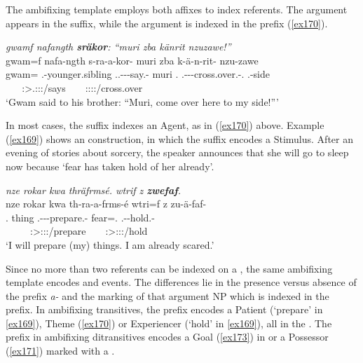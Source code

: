 The ambifixing template employs both affixes to index referents. The  argument appears in the suffix, while the  argument is indexed in the prefix (\ref{ex170}).

\begin{exe}
	\ex \emph{gwamf nafangth \textbf{sräkor}: ``muri zba känrit nzuzawe!''}\\
	\glll gwam=f nafa-ngth s-ra-a-kor-\Zero{} muri zba k-ä-n-rit-\Zero{} nzu-zawe\\
	gwam=\Erg{} \Third.\Poss-younger.sibling \Tsg.\Masc.\Bet-\Irr-\Ndu-say.\Rs-\Stsg{} muri \Prox.\Abl{} \M.\Bet-\Ndu-\Venit-cross.over.\Rs-\Ssg.\Imp{} \Fsg.\Poss-side\\
	~ ~ {\Stsg:\Sbj>\Tsg.\Masc:\Obj:\Irr:\Pfv/says} ~ ~ {\Ssg:\Sbj:\Imp:\Pfv:\Venit/cross.over} ~\\
	\trans `Gwam said to his brother: ``Muri, come over here to my side!'''\\ 
	\label{ex170}
\end{exe}

In most cases, the suffix indexes an Agent, as in (\ref{ex170}) above. Example (\ref{ex169}) shows an  construction, in which the suffix encodes a Stimulus. After an evening of stories about sorcery, the speaker announces that she will go to sleep now because `fear has taken hold of her already'.

\begin{exe}
	\ex \emph{nze rokar kwa thräfrmsé. wtrif z \textbf{zwefaf}.}\\
	\glll nze rokar kwa th-ra-a-frms-é wtri=f z{\fixgll} zu-ä-faf-\Zero\\
	\Fsg.\Erg{} thing \Fut{} \Stnsg.\Bet-\Irr-\Vc\textbar\Ndu-prepare.\Rs-\Fsg{} fear=\Erg.\Sg{} \Iam{} \Fsg.\Gam-\Ndu-hold.\Rs-\Stsg{}\\
	~ ~ ~ {\Fsg:\Sbj>\Stpl:\Obj:\Irr:\Pfv/prepare} ~ ~ {\Stsg:\Sbj>\Fsg:\Obj:\Rpst:\Pfv/hold}\\
	\trans `I will prepare (my) things. I am already scared.' 
	\label{ex169}
\end{exe}

Since no more than two referents can be indexed on a , the same ambifixing template encodes  and  events. The differences lie in the presence versus absence of the  prefix \emph{a-} and the  marking of that argument NP which is indexed in the prefix. In ambifixing transitives, the prefix encodes a Patient (`prepare' in \ref{ex169}), Theme (\ref{ex170}) or Experiencer (`hold' in \ref{ex169}), all in the . The prefix in ambifixing ditransitives encodes a Goal (\ref{ex173}) in   or a Possessor (\ref{ex171}) marked with a .


